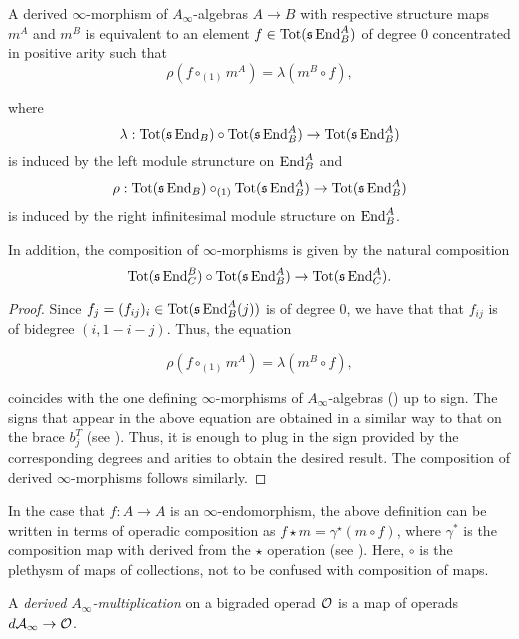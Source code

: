 \documentclass[join.tex]{subfiles}
\begin{document}
\begin{lem}\label{dinfinitymorphism}
A derived $\infty$-morphism of $A_\infty$-algebras $A\to B$ with respective structure maps $m^A$ and $m^B$ is equivalent to an element $f\in\mathrm{Tot}(\mathfrak{s}\operatorname{End}^A_B)$ of degree 0 concentrated in positive arity such that \[\rho(f\circ_{(1)}m^A)=\lambda(m^B\circ f),\] 

where \[\lambda:\mathrm{Tot}(\mathfrak{s}\operatorname{End}_B)\circ \mathrm{Tot}(\mathfrak{s}\operatorname{End}^A_B)\to \mathrm{Tot}(\mathfrak{s}\operatorname{End}^A_B)\] is induced by the left module struncture on $\operatorname{End}^A_B$ and \[\rho:\mathrm{Tot}(\mathfrak{s}\operatorname{End}_B)\circ_{(1)}\mathrm{Tot}(\mathfrak{s}\operatorname{End}^A_B)\to \mathrm{Tot}(\mathfrak{s}\operatorname{End}^A_B)\] is induced by the right infinitesimal module structure on $\operatorname{End}^A_B$. 

In addition, the composition of $\infty$-morphisms is given by the natural composition \[\mathrm{Tot}(\mathfrak{s}\operatorname{End}^B_C)\circ \mathrm{Tot}(\mathfrak{s}\operatorname{End}^A_B)\to \mathrm{Tot}(\mathfrak{s}\operatorname{End}^A_C).\]
\end{lem}
\begin{proof}
Since $f_j=(f_{ij})_i\in\mathrm{Tot}(\mathfrak{s}\operatorname{End}^A_B(j))$ is of degree $0$, we have that that $f_{ij}$ is of bidegree $(i,1-i-j)$. Thus, the equation

\[\rho(f\circ_{(1)}m^A)=\lambda(m^B\circ f),\] 

coincides with the one defining $\infty$-morphisms of $A_\infty$-algebras () up to sign. The signs that appear in the above equation are obtained in a similar way to that on the brace $b_j^T$ (see ). Thus, it is enough to plug in the sign provided by  the corresponding degrees and arities to obtain the desired result. The composition of derived $\infty$-morphisms follows similarly.
\end{proof}

In the case that $f:A\to A$ is an $\infty$-endomorphism, the above definition can be written in terms of operadic composition as $f\star m=\gamma^\star(m\circ f)$, where $\gamma^*$ is the composition map with derived from the $\star$ operation (see ). Here, $\circ$ is the plethysm of maps of collections, not to be confused with composition of maps. 


\begin{defin}
A \emph{derived $A_\infty$-multiplication} on a bigraded operad ${\mathcal O}$ is a map of operads $d\mathcal{A}_\infty\to{\mathcal O}$.
\end{defin}
\end{document}

